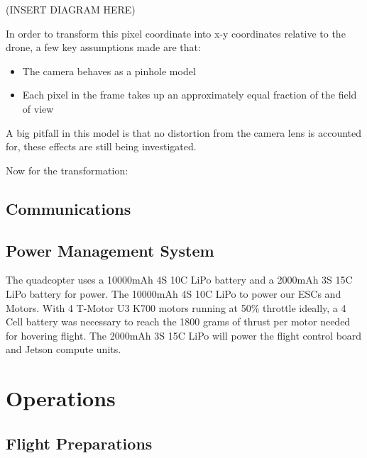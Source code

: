 \documentclass[12pt,letterpaper]{article}
\begin{document}
			(INSERT DIAGRAM HERE)

			In order to transform this pixel coordinate into x-y coordinates relative to the drone, a few key assumptions made are that:

				\begin{itemize}
					\item The camera behaves as a pinhole model
					\item Each pixel in the frame takes up an approximately equal fraction of the field of view
				\end{itemize}

			A big pitfall in this model is that no distortion from the camera lens is accounted for, these effects are still being investigated.

			Now for the transformation:

	\subsection*{Communications}
	\subsection*{Power Management System}
		The quadcopter uses a 10000mAh 4S 10C LiPo battery and a 2000mAh 3S 15C LiPo battery for power. The 10000mAh 4S 10C LiPo to power our ESCs and Motors. With 4 T-Motor U3 K700 motors running at 50\% throttle ideally, a 4 Cell battery was necessary to reach the 1800 grams of thrust per motor needed for hovering flight. The 2000mAh 3S 15C LiPo will power the flight control board and Jetson compute units.

\section*{Operations}
	\subsection*{Flight Preparations}
\end{document}

